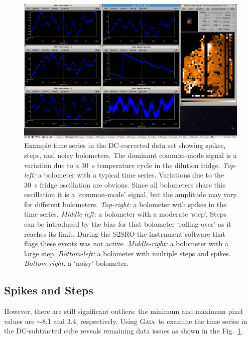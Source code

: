 \documentclass[twoside,11pt]{article}
\newcommand{\about}{$\sim$}
\newcommand{\xref}[3]{#1}
\newcommand{\xlabel}[1]{}
\renewcommand{\_}{\texttt{\symbol{95}}}
\newcommand{\gaia}{\xref{\textsc{Gaia}}{sun214}{}}
\begin{document}
\begin{figure}
\begin{center}
\includegraphics[width=1.0\linewidth]{sc19_timeseries}
\caption{Example time series in the DC-corrected data set showing
spikes, steps, and noisy bolometers. The dominant common-mode signal is
a variation due to a 30~s temperature cycle in the dilution fridge.
\textsl{Top-left:} a bolometer with a typical time
series. Variations due to the 30~s fridge oscillation are
obvious. Since all bolometers share this oscillation it is a
`common-mode' signal, but the amplitude may vary for different
bolometers.
\textsl{Top-right:} a bolometer with spikes in the time
series. \textsl{Middle-left:} a bolometer with a moderate `step'. Steps
can be introduced by the bias for that bolometer `rolling-over' as it
reaches its limit. During the S2SRO the instrument software that flags
these events was not active.
\textsl{Middle-right:} a bolometer with a large step.
\textsl{Bottom-left:} a bolometer with multiple steps and
spikes.
\textsl{Bottom-right:} a `noisy' bolometer. }
\label{fig:timeseries}
\end{center}
\end{figure}

\subsection{\xlabel{spikesteps}Spikes and Steps}
\label{sec:spikesteps}

However, there are still significant outliers: the minimum and maximum
pixel values are \about8.1 and 3.4, respectively. Using \gaia\ to examine
the time series in the DC-subtracted cube reveals remaining data issues as
shown in the Fig.~\ref{fig:timeseries}.
\end{document}
